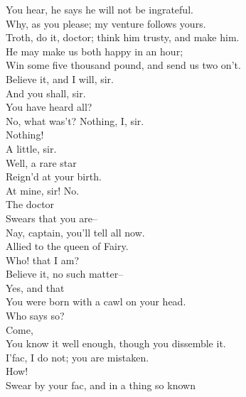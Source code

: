 \documentclass{memoir}
\begin{document}
\begin{drama*}
 You hear, he says he will not be ingrateful.\\
\subtlespeaks  Why, as you please; my venture follows yours.\\
\facespeaks  Troth, do it, doctor; think him trusty, and make him.\\
 He may make us both happy in an hour;\\
 Win some five thousand pound, and send us two on't.\\
\dapperspeaks  Believe it, and I will, sir.\\
\facespeaks {} And you shall, sir.\\
 You have heard all?\\
\dapperspeaks {} No, what was't? Nothing, I, sir.\\
\facespeaks  Nothing!\\
\dapperspeaks {} A little, sir.\\
\facespeaks {} Well, a rare star\\
 Reign'd at your birth.\\
\dapperspeaks {} At mine, sir! No.\\
\facespeaks {} The doctor\\
 Swears that you are--\\
\subtlespeaks {} Nay, captain, you'll tell all now.\\
\facespeaks  Allied to the queen of Fairy.\\
\dapperspeaks {} Who! that I am?\\
 Believe it, no such matter--\\
\facespeaks {} Yes, and that\\
 You were born with a cawl on your head.\\
\dapperspeaks {} Who says so?\\
\facespeaks  Come,\\
 You know it well enough, though you dissemble it.\\
\dapperspeaks  I'fac, I do not; you are mistaken.\\
\facespeaks  How!\\
 Swear by your fac, and in a thing so known\\

\end{drama*}
\end{document}
